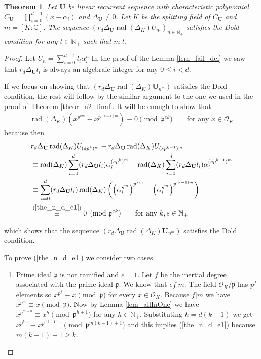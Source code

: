 \documentclass[preprint,12pt]{elsarticle}
\newcommand{\N}{\mathbb{N}}
\newcommand{\Q}{\mathbb{Q}}
\newcommand{\OO}{\mathcal{O}}
\newcommand{\pp}{\mathfrak{p} }
\DeclareMathOperator{\rad}{rad}
\newtheorem{theorem}{Theorem}
\begin{document}
 
\begin{theorem}\label{the_n_d}
    Let $\textbf{U}$ be linear recurrent sequence with characteristic polynomial $C_{\textbf{U}}=\prod_{i=0}^{d-1}(x-\alpha_i)$ and $\Delta_\mathbf{U}\not=0$. Let $K$ be the splitting field of $C_{\textbf{U}}$ and $m=[K:\Q]$. The sequence $(r_d\Delta_\mathbf{U}\rad(\Delta_K) {U}_{n^t})_{n\in\N_+}$ satisfies the Dold condition for any $t\in\N_+$ such that $m|t$.
\end{theorem}
\begin{proof}
    Let $U_n = \sum_{i=0}^{d-1} l_i\alpha_i^n$
    In the proof of the Lemma \ref{lem_fail_del} we saw that $r_d\Delta_\mathbf{U}l_i$ is always an algebraic integer for any $0\leqslant i<d$. 

    If we focus on showing that $(r_d\Delta_\mathbf{U}\rad(\Delta_K) \mathbf{U}_{n^m})$ satisfies the Dold condition, the rest will follow by the similar argument to the one we used in the proof of Theorem \ref{theor_n2_final}.
    It will be enough to show that 
    \begin{align}\label{the_n_d_e1}
        \rad(\Delta_K)\left(x^{p^{km}} - x^{p^{(k-1)m}}\right) 
        \equiv 0 \pmod {\pp^{ek}} 
        \quad\quad \text{for any $x\in \OO_K$}
    \end{align}
    because then 
    \begin{align}
        &r_d\Delta_\mathbf{U}\rad(\Delta_K) {U}_{(sp^k)^m} -  r_d\Delta_\mathbf{U}\rad(\Delta_K) {U}_{(sp^{k-1})^m} 
        \\ &\equiv \rad(\Delta_K)\sum_{i=0}^d (r_d\Delta_\mathbf{U}l_i)\alpha_i^{(sp^k)^m} - \rad(\Delta_K)\sum_{i=0}^d (r_d\Delta_\mathbf{U}l_i)\alpha_i^{(sp^{k-1})^m}
        \\&\equiv  \sum_{i=0}^d(r_d\Delta_\mathbf{U} l_i)\rad(\Delta_K)\left(\left(\alpha_i^{s^m}\right)^{p^{km}} - \left(\alpha_i^{s^m}\right)^{p^{(k-1)m}} \right)
        \\  &\overset{(\ref{the_n_d_e1})}{\equiv} 0 \pmod {\pp^{ek}} \quad\quad\text{for any $k,s\in\N_+$}
    \end{align}

which shows that the sequence $(r_d\Delta_\mathbf{U}\rad(\Delta_K) \mathbf{U}_{n^m})$ satisfies the Dold condition.

To prove (\ref{the_n_d_e1}) we consider two cases.
\begin{enumerate}
    \item Prime ideal $\pp$ is not ramified and $e = 1$. Let $f$ be the inertial degree associated with the prime ideal $\pp$. We know that $ef|m$. The field $\OO_K/\pp$ has $p^f$ elements so $x^{p^f}\equiv x \pmod \pp$ for every $x\in\OO_K$. Because $f|m$ we have $x^{p^m}\equiv x \pmod \pp$. Now by Lemma \ref{lem_allInOne} we have $x^{p^{m+h}}\equiv x^{h} \pmod {\pp^{h+1}}$ for any $h\in\N_+$. Substituting $h = d(k-1)$ we get $x^{p^{km}}\equiv x^{p^{(k-1)m}} \pmod {\pp^{m(k-1)+1}}$ and this implies (\ref{the_n_d_e1}) because $m(k-1)+1 \geqslant k$.


\end{enumerate}
\end{proof}
\end{document}
